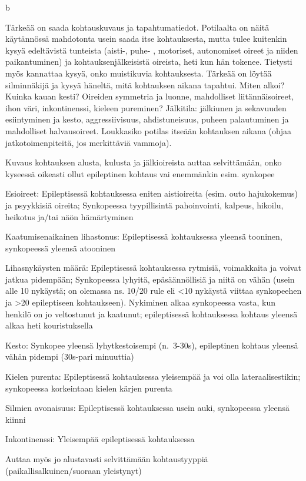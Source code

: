 \documentclass[
]{book}
\begin{document}
b

Tärkeää on saada kohtauskuvaus ja tapahtumatiedot. Potilaalta on näitä käytännössä mahdotonta usein saada itse kohtauksesta, mutta tulee kuitenkin kysyä edeltävistä tunteista (aisti-, puhe- , motoriset, autonomiset oireet ja niiden paikantuminen) ja kohtauksenjälkeisistä oireista, heti kun hän tokenee. Tietysti myös kannattaa kysyä, onko muistikuvia kohtauksesta. Tärkeää on löytää silminnäkijä ja kysyä häneltä, mitä kohtauksen aikana tapahtui. Miten alkoi? Kuinka kauan kesti? Oireiden symmetria ja luonne, mahdolliset liitännäisoireet, ihon väri, inkontinenssi, kieleen pureminen? Jälkitila: jälkiunen ja sekavuuden esiintyminen ja kesto, aggressiivisuus, ahdistuneisuus, puheen palautuminen ja mahdolliset halvausoireet. Loukkasiko potilas itseään kohtauksen aikana (ohjaa jatkotoimenpiteitä, jos merkittäviä vammoja).

Kuvaus kohtauksen alusta, kulusta ja jälkioireista auttaa selvittämään, onko kyseessä oikeasti ollut epileptinen kohtaus vai enemmänkin esim. synkopee

Esioireet: Epileptisessä kohtauksessa eniten aistioireita (esim. outo hajukokemus) ja psyykkisiä oireita; Synkopeessa tyypillisintä pahoinvointi, kalpeus, hikoilu, heikotus ja/tai näön hämärtyminen

Kaatumisenaikainen lihastonus: Epileptisessä kohtauksessa yleensä tooninen, synkopeessä yleensä atooninen

Lihasnykäysten määrä: Epileptisessä kohtauksessa rytmisiä, voimakkaita ja voivat jatkua pidempään; Synkopeessa lyhyitä, epäsäännöllisiä ja niitä on vähän (usein alle 10 nykäystä; on olemassa ns. 10/20 rule eli \textless10 nykäystä viittaa synkopeehen ja \textgreater20 epileptiseen kohtaukseen). Nykiminen alkaa synkopeessa vasta, kun henkilö on jo veltostunut ja kaatunut; epileptisessä kohtauksessa kohtaus yleensä alkaa heti kouristuksella

Kesto: Synkopee yleensä lyhytkestoisempi (n.~3-30s), epileptinen kohtaus yleensä vähän pidempi (30s-pari minuuttia)

Kielen purenta: Epileptisessä kohtauksessa yleisempää ja voi olla lateraalisestikin; synkopeessa korkeintaan kielen kärjen purenta

Silmien avonaisuus: Epileptisessä kohtauksessa usein auki, synkopeessa yleensä kiinni

Inkontinenssi: Yleisempää epileptisessä kohtauksessa

Auttaa myös jo alustavasti selvittämään kohtaustyyppiä (paikallisalkuinen/suoraan yleistynyt)
\end{document}
